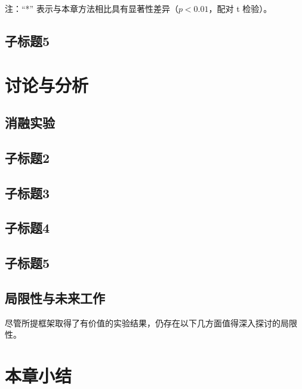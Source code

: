 \begin{table}[htbp]
  \vspace{-1ex} %
  \begin{flushleft}
    \footnotesize 注：“*” 表示与本章方法相比具有显著性差异（$p < 0.01$，配对 t 检验）。
  \end{flushleft}
  \label{tab:tabel1.2}
\end{table}

\subsection{子标题5}

\section{讨论与分析}

\subsection{消融实验}

\subsection{子标题2}

\subsection{子标题3}

\subsection{子标题4}

\subsection{子标题5}

\subsection{局限性与未来工作}

尽管所提框架取得了有价值的实验结果，仍存在以下几方面值得深入探讨的局限性。

\section{本章小结}


